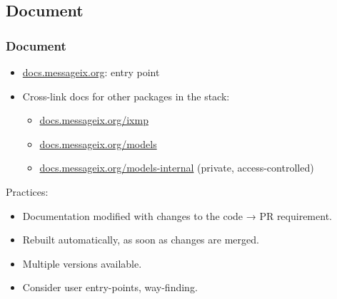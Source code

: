 \documentclass[12pt,aspectratio=169]{beamer}
\begin{document}
\subsection{Document}

\begin{frame}
\frametitle{Document}

\begin{itemize}
  \item \href{https://docs.messageix.org}{docs.messageix.org}: entry point
  \item Cross-link docs for other packages in the stack:
    \begin{itemize}
      \item \href{https://docs.messageix.org/ixmp}{docs.messageix.org/ixmp}
      \item \href{https://docs.messageix.org/models}{docs.messageix.org/models}
      \item \href{https://docs.messageix.org/models-internal}{docs.messageix.org/models-internal} (private, access-controlled)
    \end{itemize}
\end{itemize}

\medskip
Practices:
\begin{itemize}
  \item Documentation modified with changes to the code → PR requirement.
  \item Rebuilt automatically, as soon as changes are merged.
  \item Multiple versions available.
  \item Consider user entry-points, way-finding.
\end{itemize}

\end{frame}
\end{document}
